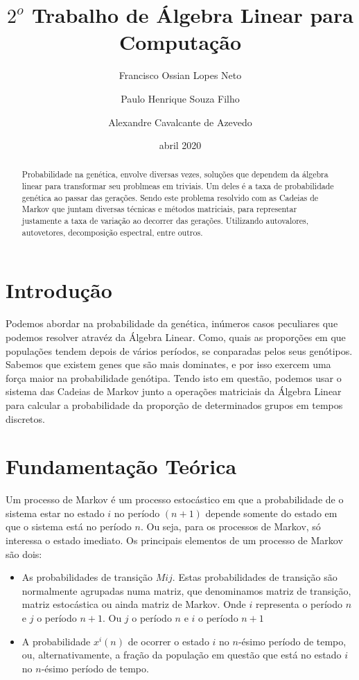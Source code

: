 \documentclass[14pt]{article}
\title{$2^o$ Trabalho de Álgebra Linear para Computação}
\author{
  Francisco Ossian Lopes Neto\\
  \and
  Paulo Henrique Souza Filho\\
  \and
  Alexandre Cavalcante de Azevedo\\
  \and
}
\date{abril 2020}
\begin{document}
\maketitle

\begin{abstract}
Probabilidade na genética, envolve diversas vezes, soluções que dependem da álgebra linear para transformar seu problmeas em triviais. Um deles é a taxa de probabilidade genética ao passar das gerações. Sendo este problema resolvido com as Cadeias de Markov que juntam diversas técnicas e métodos matriciais, para representar justamente a taxa de variação ao decorrer das gerações. Utilizando autovalores, autovetores, decomposição espectral, entre outros.
\end{abstract}


\section{Introdução}
\label{sec:introducao}

Podemos abordar na probabilidade da genética, inúmeros casos peculiares que podemos resolver atravéz da Álgebra Linear. Como, quais as proporções em que populações tendem depois de vários períodos, se conparadas pelos seus genótipos. Sabemos que existem genes que são mais dominates, e por isso exercem uma força maior na probabilidade genótipa. Tendo isto em questão, podemos usar o sistema das Cadeias de Markov junto a operações matriciais da Álgebra Linear para calcular a probabilidade da proporção de determinados grupos em tempos discretos. 


\section{Fundamentação Teórica}
\label{sec:fundamentacao}

Um processo de Markov é um processo estocástico em que a probabilidade de o sistema estar no estado $i$ no período $(n+1)$ depende somente do estado em que o sistema está no período $n$. Ou seja, para os processos de Markov, só interessa o estado imediato. Os principais elementos de um processo de Markov são dois:

\begin{itemize}

\item As probabilidades de transição $Mij$. Estas probabilidades de transição são normalmente agrupadas numa matriz, que denominamos matriz de transição, matriz estocástica ou ainda matriz de Markov. Onde $i$ representa o período $n$ e $j$ o período $n+1$. Ou $j$ o período $n$ e $i$ o período $n+1$

\item A probabilidade $x^i(n)$ de ocorrer o estado $i$ no $n$-ésimo período de tempo, ou, alternativamente, a fração da população em questão que está no estado $i$ no $n$-ésimo período de tempo.

\end{itemize}
\end{document}

